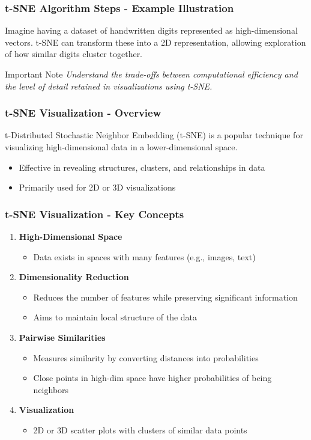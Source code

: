 \documentclass{beamer}
\begin{document}
\begin{frame}[fragile]
    \frametitle{t-SNE Algorithm Steps - Example Illustration}
    Imagine having a dataset of handwritten digits represented as high-dimensional vectors. t-SNE can transform these into a 2D representation, allowing exploration of how similar digits cluster together.
    \begin{block}{Important Note}
        \textit{Understand the trade-offs between computational efficiency and the level of detail retained in visualizations using t-SNE.}
    \end{block}
\end{frame}

\begin{frame}[fragile]
    \frametitle{t-SNE Visualization - Overview}
    t-Distributed Stochastic Neighbor Embedding (t-SNE) is a popular technique for visualizing high-dimensional data in a lower-dimensional space. 
    \begin{itemize}
        \item Effective in revealing structures, clusters, and relationships in data
        \item Primarily used for 2D or 3D visualizations
    \end{itemize}
\end{frame}

\begin{frame}[fragile]
    \frametitle{t-SNE Visualization - Key Concepts}
    \begin{enumerate}
        \item \textbf{High-Dimensional Space}
            \begin{itemize}
                \item Data exists in spaces with many features (e.g., images, text)
            \end{itemize}
        \item \textbf{Dimensionality Reduction}
            \begin{itemize}
                \item Reduces the number of features while preserving significant information
                \item Aims to maintain local structure of the data
            \end{itemize}
        \item \textbf{Pairwise Similarities}
            \begin{itemize}
                \item Measures similarity by converting distances into probabilities
                \item Close points in high-dim space have higher probabilities of being neighbors
            \end{itemize}
        \item \textbf{Visualization}
            \begin{itemize}
                \item 2D or 3D scatter plots with clusters of similar data points
            \end{itemize}
    \end{enumerate}
\end{frame}
\end{document}
